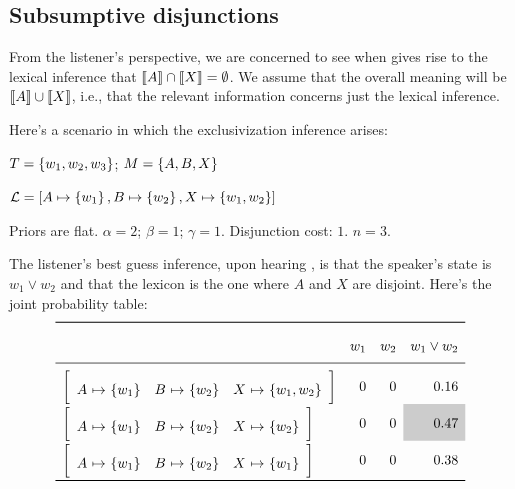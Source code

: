 \documentclass{article}
\begin{document}
\newcommand{\smallhurfordlex}[3]{
  \left[
    \begin{array}[c]{l@{ \ \mapsto \ }r l@{ \ \mapsto \ }r l@{ \ \mapsto \ }r}
      A & \set{#1} &
      B & \set{#2} &
      X & \set{#3}
    \end{array}
  \right]}


\subsection{Subsumptive disjunctions}\label{sec:analysis:subsumptive}

\begin{examples}
\item From the listener's perspective, we are concerned to see when
   gives rise to the lexical inference that $\llbracket A\rrbracket \cap
  \llbracket X\rrbracket = \emptyset$. We assume that the overall meaning will be
  $\llbracket A\rrbracket \cup \llbracket X\rrbracket$, i.e., that the relevant information concerns
  just the lexical inference.

\item Here's a scenario in which the exclusivization inference arises:

  \begin{examples}
  \item $T = \left\{ w_{1}, w_{2}, w_{3} \right\}$;  $M = \left\{ A, B, X \right\}$
  \item $\mathcal{L} = [A \mapsto \left\{ w_{1} \right\}, B \mapsto \left\{ w_{2} \right\}, X \mapsto \left\{ w_{1}, w_{2} \right\}]$
  \item Priors are flat. $\alpha = 2$; $\beta = 1$; $\gamma = 1$. Disjunction cost: $1$. $n = 3$. 
  \end{examples}

\item The listener's best guess inference, upon hearing ,
  is that the speaker's state is $w_{1} \vee w_{2}$ and that the
  lexicon is the one where $A$ and $X$ are disjoint. Here's the joint
  probability table:
  \[
  \renewcommand{\arraystretch}{2}
  \begin{array}[c]{l r r r}
    \toprule
            & w_{1} & w_{2} & w_{1} \vee w_{2} \\
    \midrule
    \smallhurfordlex{w_{1}}{w_{2}}{w_{1}, w_{2}} & 0 & 0 & 0.16 \\
    \smallhurfordlex{w_{1}}{w_{2}}{w_{2}} & 0 & 0 & \graycell{0.47} \\
    \smallhurfordlex{w_{1}}{w_{2}}{w_{1}} & 0 & 0 & 0.38 \\
    \bottomrule
  \end{array}
  \]


\end{examples}
\end{document}
